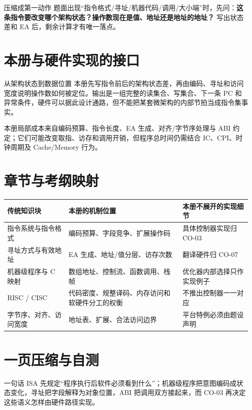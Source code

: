 \documentclass[UTF8,fontset=fandol,11pt,a4paper]{ctexart}
\newcommand{\kw}[1]{\textbf{\color{deep}#1}}
\begin{document}
\begin{methodbox}{压缩成第一动作}
题面出现“指令格式/寻址/机器代码/调用/大小端”时，先问：\kw{这条指令要改变哪个架构状态？操作数现在是值、地址还是地址的地址？} 写出状态差和 EA 后，剩余计算才有唯一落点。
\end{methodbox}

\section{本册与硬件实现的接口}
\begin{corebox}{从架构状态到数据位置}
本册先写指令前后的架构状态差，再由编码、寻址和访问宽度说明操作数如何被定位。输出是一组完整的读集合、写集合、下一条 PC 和异常条件，硬件可以据此设计通路，但不能把某套微架构的内部节拍当成指令集事实。
\end{corebox}
本册局部成本来自编码预算、指令长度、EA 生成、对齐/字节序处理与 ABI 约定；它们可能改变取指、访存和调用开销，但程序总时间仍需结合 IC、CPI、时钟周期及 Cache/Memory 行为。

\section{章节与考纲映射}

\begin{center}\small
\begin{tabularx}{\linewidth}{L{3.2cm}L{5.4cm}Y}
\toprule
传统知识块 & 本册的机制位置 & 本册不展开的实现细节\\
\midrule
指令系统与指令格式 & 编码预算、字段竞争、扩展操作码 & 具体控制器实现归 CO-03\\
寻址方式与有效地址 & EA 生成、地址/值分层、访存次数 & 翻译硬件归 CO-07\\
机器级程序与 C 映射 & 数组地址、控制流、函数调用、栈帧 & 优化器内部选择只作实现例子\\
RISC / CISC & 代码密度、规整译码、内存访问和软硬件分工的权衡 & 不推出控制器一一对应\\
字节序、对齐、访问宽度 & 地址表、扩展、合法访问边界 & 平台特例必须由题设声明\\
\bottomrule
\end{tabularx}
\end{center}

\section{一页压缩与自测}

\begin{corebox}{一句话}
ISA 先规定“程序执行后软件必须看到什么”；机器级程序把意图编码成状态变化，寻址把字段解释为对象位置，ABI 把调用双方接起来，而 CO-03 再决定这些语义怎样由硬件路径实现。
\end{corebox}
\end{document}
